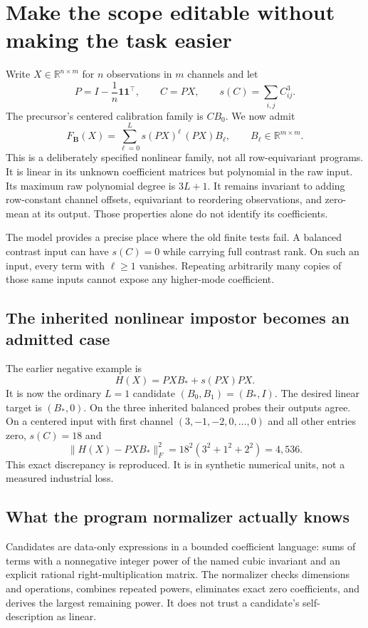 \documentclass[11pt,letterpaper]{article}
\newcommand{\R}{\mathbb R}\newcommand{\V}{\mathcal V}\newcommand{\N}{\mathcal N}
\theoremstyle{remark}\newtheorem{remark}{Remark}[section]
\begin{document}
\section{Make the scope editable without making the task easier}
\label{sec:family}
Write $X\in\R^{n\times m}$ for $n$ observations in $m$ channels and let
\begin{equation}
 P=I-\frac1n\mathbf1\mathbf1^\top,\qquad C=PX,\qquad
 s(C)=\sum_{i,j} C_{ij}^{3}.
\end{equation}
The precursor's centered calibration family is $CB_0$. We now admit
\begin{equation}
 \boxed{\quad F_{\boldsymbol B}(X)=\sum_{\ell=0}^{L}s(PX)^\ell\,(PX)B_\ell,\qquad
 B_\ell\in\R^{m\times m}.\quad}\label{eq:family}
\end{equation}
This is a deliberately specified nonlinear family, not all row-equivariant programs. It is linear in its unknown coefficient matrices but polynomial in the raw input. Its maximum raw polynomial degree is $3L+1$. It remains invariant to adding row-constant channel offsets, equivariant to reordering observations, and zero-mean at its output. Those properties alone do not identify its coefficients.

The model provides a precise place where the old finite tests fail. A balanced contrast input can have $s(C)=0$ while carrying full contrast rank. On such an input, every term with $\ell\ge1$ vanishes. Repeating arbitrarily many copies of those same inputs cannot expose any higher-mode coefficient.

\subsection{The inherited nonlinear impostor becomes an admitted case}
The earlier negative example is
\begin{equation}
 H(X)=PXB_*+s(PX)PX.
\end{equation}
It is now the ordinary $L=1$ candidate $(B_0,B_1)=(B_*,I)$. The desired linear target is $(B_*,0)$. On the three inherited balanced probes their outputs agree. On a centered input with first channel $(3,-1,-2,0,\ldots,0)$ and all other entries zero, $s(C)=18$ and
\begin{equation}
 \|H(X)-PXB_*\|_F^2=18^2(3^2+1^2+2^2)=4{,}536.
\end{equation}
This exact discrepancy is reproduced. It is in synthetic numerical units, not a measured industrial loss.

\subsection{What the program normalizer actually knows}
Candidates are data-only expressions in a bounded coefficient language: sums of terms with a nonnegative integer power of the named cubic invariant and an explicit rational right-multiplication matrix. The normalizer checks dimensions and operations, combines repeated powers, eliminates exact zero coefficients, and derives the largest remaining power. It does not trust a candidate's self-description as linear.
\end{document}
